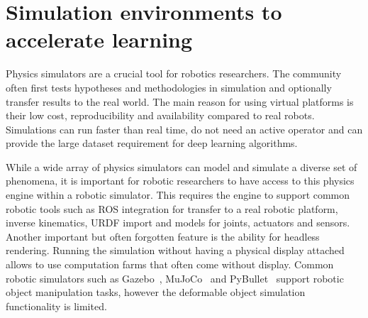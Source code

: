 \documentclass[\home/main.tex]{subfiles}
\begin{document}
\section{Simulation environments to accelerate learning} \label{sec:lit_simulation}
Physics simulators are a crucial tool for robotics researchers. The community often first tests hypotheses and methodologies in simulation and optionally transfer results to the real world. The main reason for using virtual platforms is their low cost, reproducibility and availability compared to real robots. Simulations can run faster than real time, do not need an active operator and can provide the large dataset requirement for deep learning algorithms. 

While a wide array of physics simulators can model and simulate a diverse set of phenomena, it is important for robotic researchers to have access to this physics engine within a robotic simulator. This requires the engine to support common robotic tools such as ROS integration for transfer to a real robotic platform, inverse kinematics, URDF import and models for joints, actuators and sensors. Another important but often forgotten feature is the ability for headless rendering. Running the simulation without having a physical display attached allows to use computation farms that often come without display. Common robotic simulators such as Gazebo~\autocite{gazebo}, MuJoCo~\autocite{mujoco} and PyBullet~\autocite{pybullet} support robotic object manipulation tasks, however the deformable object simulation functionality is limited. 
\end{document}
